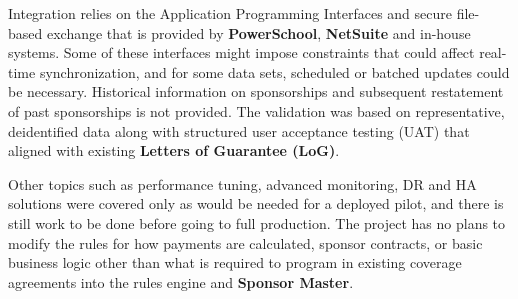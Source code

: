     Integration relies on the Application Programming Interfaces and secure file-based exchange that is provided by \textbf{PowerSchool}, \textbf{NetSuite} and in-house systems. Some of these interfaces might impose constraints that could affect real-time synchronization, and for some data sets, scheduled or batched updates could be necessary. Historical information on sponsorships and subsequent restatement of past sponsorships is not provided. The validation was based on representative, deidentified data along with structured user acceptance testing (UAT) that aligned with existing \textbf{Letters of Guarantee (LoG)}.
    
    Other topics such as performance tuning, advanced monitoring, DR and HA solutions were covered only as would be needed for a deployed pilot, and there is still work to be done before going to full production. The project has no plans to modify the rules for how payments are calculated, sponsor contracts, or basic business logic other than what is required to program in existing coverage agreements into the rules engine and \textbf{Sponsor Master}.
    